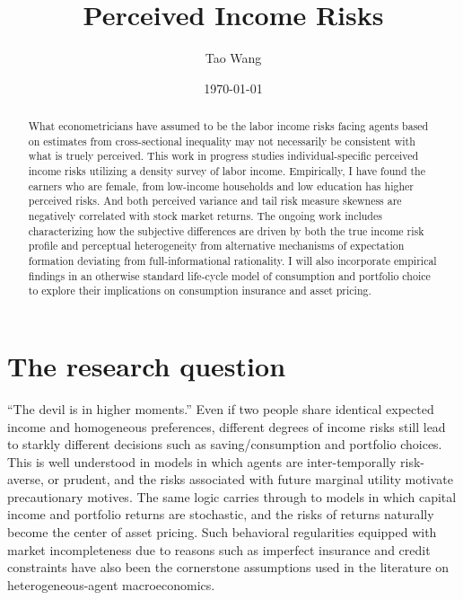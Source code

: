 \documentclass[12pt,notitlepage,onecolumn,aps,pra]{article}
\begin{document}
    
    \title{Perceived Income Risks}\author{Tao Wang}

\date{\today}
\maketitle\begin{abstract}What econometricians have assumed to be the labor income risks facing agents based on estimates from cross-sectional inequality may not necessarily be consistent with what is truely perceived.  This work in progress studies individual-specific perceived income risks utilizing a density survey of labor income. Empirically, I have found the earners who are female, from low-income households and low education has higher perceived risks. And both perceived variance and tail risk measure skewness are negatively correlated with stock market returns. The ongoing work includes characterizing how the subjective differences are driven by both the true income risk profile and perceptual heterogeneity from alternative mechanisms of expectation formation deviating from full-informational rationality. I will also incorporate empirical findings in an otherwise standard life-cycle model of consumption and portfolio choice to explore their implications on consumption insurance and asset pricing.\end{abstract}


    
    

    
    \hypertarget{the-research-question}{%
\section{The research question}\label{the-research-question}}

``The devil is in higher moments.'' Even if two people share identical
expected income and homogeneous preferences, different degrees of income
risks still lead to starkly different decisions such as
saving/consumption and portfolio choices. This is well understood in
models in which agents are inter-temporally risk-averse, or prudent, and
the risks associated with future marginal utility motivate precautionary
motives. The same logic carries through to models in which capital
income and portfolio returns are stochastic, and the risks of returns
naturally become the center of asset pricing. Such behavioral
regularities equipped with market incompleteness due to reasons such as
imperfect insurance and credit constraints have also been the
cornerstone assumptions used in the literature on heterogeneous-agent
macroeconomics.
\end{document}
